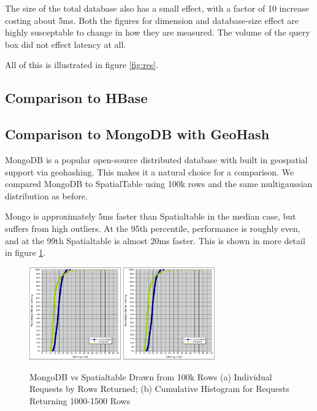 \documentclass[11pt]{article}
\begin{document}
The size of the total database also has a small effect, with a factor of 10 increase costing about 5ms.  Both the figures for dimension and database-size effect are highly susceptable to change in how they are measured.  The volume of the query box did not effect latency at all.

All of this is illustrated in figure \ref{fig:res}.

\subsection{Comparison to HBase}

\subsection{Comparison to MongoDB with GeoHash}

MongoDB is a popular open-source distributed database with built in geospatial support via geohashing.\cite{mongospatial1}\cite{mongospatial2}  This makes it a natural choice for a comparison.  We compared MongoDB to SpatialTable using 100k rows and the same multigaussian distribution as before.

Mongo is approximately 5ms faster than Spatialtable in the median case, but suffers from high outliers.   At the 95th percentile, performance is roughly even, and at the 99th Spatialtable is almost 20ms faster.  This is shown in more detail in figure \ref{fig:mongo}.

\begin{figure}[h]
\includegraphics[width=1.55in]{st_mongo_cumu}
\includegraphics[width=1.55in]{st_mongo_cumu}
\caption{MongoDB vs Spatialtable Drawn from 100k Rows (a) Individual Requests by Rows Returned; (b) Cumulative Histogram for Requests Returning 1000-1500 Rows }
\label{fig:mongo}
\end{figure}
\end{document}

